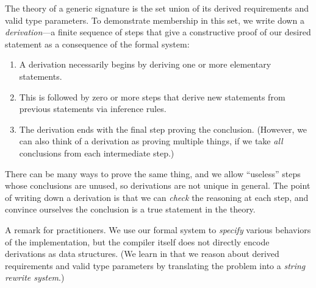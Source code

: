 \documentclass[../generics]{subfiles}
\begin{document}
The theory of a generic signature is the set union of its derived requirements and valid type parameters. To demonstrate membership in this set, we write down a \emph{derivation}---a finite sequence of steps that give a constructive proof of our desired statement as a consequence of the formal system:
\begin{enumerate}
\item A derivation necessarily begins by deriving one or more elementary statements.
\item This is followed by zero or more steps that derive new statements from previous statements via inference rules.
\item The derivation ends with the final step proving the conclusion. (However, we can also think of a derivation as proving multiple things, if we take \emph{all} conclusions from each intermediate step.)
\end{enumerate}
There can be many ways to prove the same thing, and we allow ``useless'' steps whose conclusions are unused, so derivations are not unique in general. The point of writing down a derivation is that we can \emph{check} the reasoning at each step, and convince ourselves the conclusion is a true statement in the theory.

A remark for practitioners. We use our formal system to \emph{specify} various behaviors of the implementation, but the compiler itself does not directly encode derivations as data structures. (We learn in  that we reason about derived requirements and valid type parameters by translating the problem into a \emph{string rewrite system}.)
\end{document}
